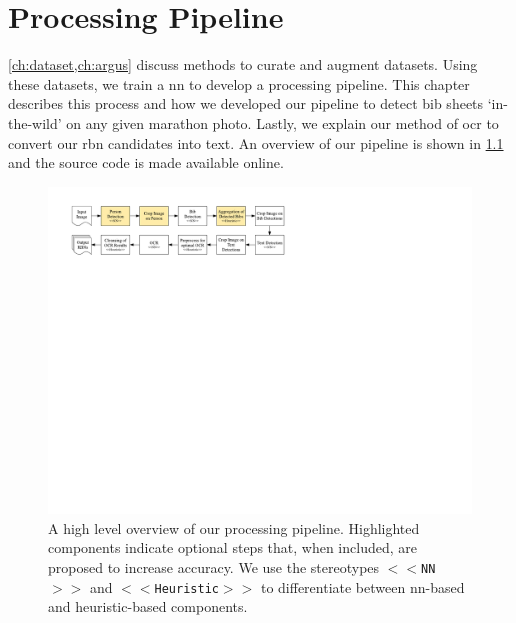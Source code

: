 \chapter{Processing Pipeline}
\label{ch:processing_pipeline}

\cref{ch:dataset,ch:argus} discuss methods to curate and augment datasets. Using these datasets, we train a \gls{nn} to develop a processing pipeline. This chapter describes this process and how we developed our pipeline to detect bib sheets `in-the-wild' on any given marathon photo. Lastly, we explain our method of \gls{ocr} to convert our \gls{rbn} candidates into text.  An overview of our pipeline is shown in \cref{fig:processing_pipeline:pipeline} and the source code is made available online.

\begin{figure}[h]
  \centering
  \includegraphics[width=\textwidth]{images/processing/pipeline}
  \caption[Overview of our processing pipeline]{A high level overview of our processing pipeline. Highlighted components indicate optional steps that, when included, are proposed to increase accuracy. We use the stereotypes \texttt{$<<$NN$>>$} and \texttt{$<<$Heuristic$>>$} to differentiate between \gls{nn}-based and heuristic-based components.}
  \label{fig:processing_pipeline:pipeline}
\end{figure}






